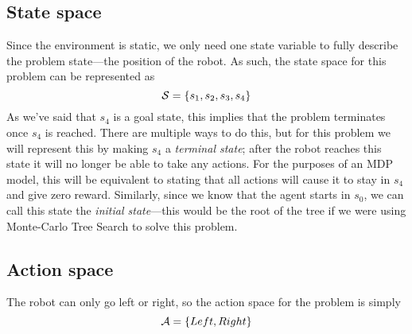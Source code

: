 \documentclass[a4paper]{article}
\begin{document}
\subsection{State space}
Since the environment is static, we only need one state variable to fully
describe the problem state---the position of the robot.
As such, the state space for this problem can be represented as
$$\mathcal{S} = \{s_1, s_2, s_3, s_4\}$$
As we've said that $s_4$ is a goal state, this implies that the
problem terminates once $s_4$ is reached.
There are multiple ways to do this, but for this problem we will represent
this by making $s_4$ a \emph{terminal state};
after the robot reaches this state it will no longer be able to take any
actions.
For the purposes of an MDP model, this will be equivalent to stating that
all actions will cause it to stay in $s_4$ and give zero reward.
Similarly, since we know that the agent starts in $s_0$, we can call
this state the \emph{initial state}---this would be the root of the tree
if we were using Monte-Carlo Tree Search to solve this problem.

\subsection{Action space}
The robot can only go left or right, so the action space for the problem is
simply
$$\mathcal{A} = \{ Left, Right \}$$
\end{document}
